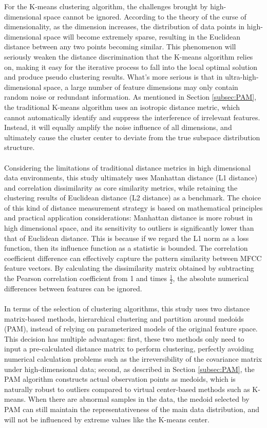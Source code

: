 For the K-means clustering algorithm, the challenges brought by high-dimensional space cannot be ignored. According to the theory of the curse of dimensionality, as the dimension increases, the distribution of data points in high-dimensional space will become extremely sparse, resulting in the Euclidean distance between any two points becoming similar. This phenomenon will seriously weaken the distance discrimination that the K-means algorithm relies on, making it easy for the iterative process to fall into the local optimal solution and produce pseudo clustering results. What's more serious is that in ultra-high-dimensional space, a large number of feature dimensions may only contain random noise or redundant information. As mentioned in Section \ref{subsec:PAM}, the traditional K-means algorithm uses an isotropic distance metric, which cannot automatically identify and suppress the interference of irrelevant features. Instead, it will equally amplify the noise influence of all dimensions, and ultimately cause the cluster center to deviate from the true subspace distribution structure. \\
\\
Considering the limitations of traditional distance metrics in high dimensional data environments, this study ultimately uses Manhattan distance (L1 distance) and correlation dissimilarity as core similarity metrics, while retaining the clustering results of Euclidean distance (L2 distance) as a benchmark. The choice of this kind of distance measurement strategy is based on mathematical principles and practical application considerations: Manhattan distance is more robust in high dimensional space, and its sensitivity to outliers is significantly lower than that of Euclidean distance. This is because if we regard the L1 norm as a loss function, then its influence function as a statistic is bounded. The correlation coefficient difference can effectively capture the pattern similarity between MFCC feature vectors. By calculating the dissimilarity matrix obtained by subtracting the Pearson correlation coefficient from 1 and times $\frac{1}{2}$, the absolute numerical differences between features can be ignored.\\
\\
In terms of the selection of clustering algorithms, this study uses two distance matrix-based methods, hierarchical clustering and partition around medoids (PAM), instead of relying on parameterized models of the original feature space. This decision has multiple advantages: first, these two methods only need to input a pre-calculated distance matrix to perform clustering, perfectly avoiding numerical calculation problems such as the irreversibility of the covariance matrix under high-dimensional data; second, as described in Section \ref{subsec:PAM}, the PAM algorithm constructs actual observation points as medoids, which is naturally robust to outliers compared to virtual center-based methods such as K-means. When there are abnormal samples in the data, the medoid selected by PAM can still maintain the representativeness of the main data distribution, and will not be influenced by extreme values like the K-means center.\\
